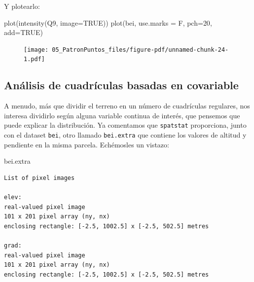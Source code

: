 \documentclass[
  letterpaper,
  DIV=11,
  numbers=noendperiod]{scrreprt}
\newenvironment{Shaded}{\begin{snugshade}}{\end{snugshade}}
\newcommand{\AttributeTok}[1]{\textcolor[rgb]{0.40,0.45,0.13}{#1}}
\newcommand{\ConstantTok}[1]{\textcolor[rgb]{0.56,0.35,0.01}{#1}}
\newcommand{\DecValTok}[1]{\textcolor[rgb]{0.68,0.00,0.00}{#1}}
\newcommand{\FunctionTok}[1]{\textcolor[rgb]{0.28,0.35,0.67}{#1}}
\newcommand{\NormalTok}[1]{\textcolor[rgb]{0.00,0.23,0.31}{#1}}
\begin{document}
Y plotearlo:

\begin{Shaded}
\begin{Highlighting}[]
\FunctionTok{plot}\NormalTok{(}\FunctionTok{intensity}\NormalTok{(Q9, }\AttributeTok{image=}\ConstantTok{TRUE}\NormalTok{))  }
\FunctionTok{plot}\NormalTok{(bei, }\AttributeTok{use.marks =}\NormalTok{ F, }\AttributeTok{pch=}\DecValTok{20}\NormalTok{, }\AttributeTok{add=}\ConstantTok{TRUE}\NormalTok{)  }
\end{Highlighting}
\end{Shaded}

\begin{figure}[H]

{\centering \texttt{[image: 05\_PatronPuntos\_files/figure-pdf/unnamed-chunk-24-1.pdf]}

}

\end{figure}

\hypertarget{anuxe1lisis-de-cuadruxedculas-basadas-en-covariable}{%
\subsection{Análisis de cuadrículas basadas en
covariable}\label{anuxe1lisis-de-cuadruxedculas-basadas-en-covariable}}

A menudo, más que dividir el terreno en un número de cuadrículas
regulares, nos interesa dividirlo según alguna variable continua de
interés, que pensemos que puede explicar la distribución. Ya comentamos
que \texttt{spatstat} proporciona, junto con el dataset \texttt{bei},
otro llamado \texttt{bei.extra} que contiene los valores de altitud y
pendiente en la misma parcela. Echémosles un vistazo:

\begin{Shaded}
\begin{Highlighting}[]
\NormalTok{bei.extra}
\end{Highlighting}
\end{Shaded}

\begin{verbatim}
List of pixel images

elev:
real-valued pixel image
101 x 201 pixel array (ny, nx)
enclosing rectangle: [-2.5, 1002.5] x [-2.5, 502.5] metres

grad:
real-valued pixel image
101 x 201 pixel array (ny, nx)
enclosing rectangle: [-2.5, 1002.5] x [-2.5, 502.5] metres
\end{verbatim}
\end{document}
